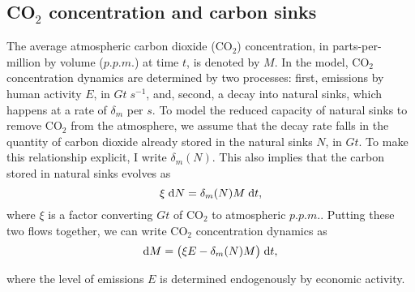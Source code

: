 \documentclass[../../main.tex]{subfiles}
\begin{document}
\subsection[Carbon Dioxide concentration]{CO$_2$ concentration and carbon sinks}

The average atmospheric carbon dioxide (CO$_2$) concentration, in parts-per-million by volume ($\unit{p.p.m.}$) at time $t$, is denoted by $M$. In the model, CO$_2$ concentration dynamics are determined by two processes: first, emissions by human activity $E$, in $\unit{Gt} \; \unit{s}^{-1}$, and, second, a decay into natural sinks, which happens at a rate of $\delta_m$ per $\unit{s}$. To model the reduced capacity of natural sinks to remove CO$_2$ from the atmosphere, we assume that the decay rate falls in the quantity of carbon dioxide already stored in the natural sinks $N$, in $\unit{Gt}$. To make this relationship explicit, I write $\delta_m(N)$. This also implies that the carbon stored in natural sinks evolves as \begin{equation}
    \xi \; \mathrm{d}N = \delta_m(N) M \; \mathrm{d}t,
\end{equation} where $\xi$ is a factor converting $\unit{Gt}$ of CO$_2$ to atmospheric $\unit{p.p.m.}$. Putting these two flows together, we can write CO$_2$ concentration dynamics as \begin{equation} \label{eq:dynamics:m:emissions}
    \mathrm{d}M = \big(\xi E - \delta_m(N) M \big) \; \mathrm{d}t,
\end{equation}

where the level of emissions $E$ is determined endogenously by economic activity. 
\end{document}
